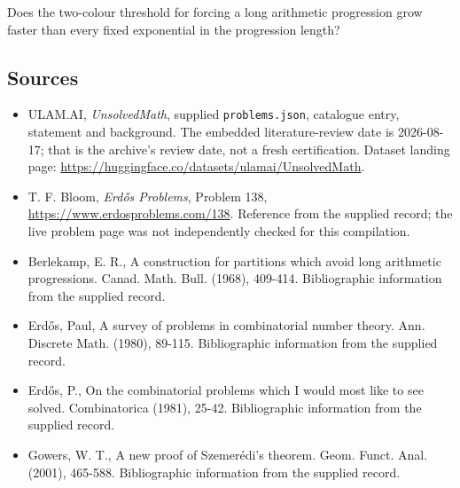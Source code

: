 \documentclass[11pt,a4paper]{article}
\begin{document}
Does the two-colour threshold for forcing a long arithmetic progression grow faster than every fixed exponential in the progression length?

\subsection{Sources}

{\small

\begin{itemize}

\item[\hypertarget{source:statement:1}{S1}] ULAM.AI, \emph{UnsolvedMath}, supplied \texttt{problems.json}, catalogue entry, statement and background. The embedded literature-review date is 2026-08-17; that is the archive’s review date, not a fresh certification. Dataset landing page: \url{https://huggingface.co/datasets/ulamai/UnsolvedMath}.

\item[\hypertarget{source:statement:2}{S2}] T. F. Bloom, \emph{Erdős Problems}, Problem 138, \url{https://www.erdosproblems.com/138}. Reference from the supplied record; the live problem page was not independently checked for this compilation.

\item[\hypertarget{source:statement:3}{S3}] Berlekamp, E. R., A construction for partitions which avoid long arithmetic progressions. Canad. Math. Bull. (1968), 409-414. Bibliographic information from the supplied record.

\item[\hypertarget{source:statement:4}{S4}] Erd\H{o}s, Paul, A survey of problems in combinatorial number theory. Ann. Discrete Math. (1980), 89-115. Bibliographic information from the supplied record.

\item[\hypertarget{source:statement:5}{S5}] Erd\H{o}s, P., On the combinatorial problems which I would most like to see solved. Combinatorica (1981), 25-42. Bibliographic information from the supplied record.

\item[\hypertarget{source:statement:6}{S6}] Gowers, W. T., A new proof of Szemer\'{e}di's theorem. Geom. Funct. Anal. (2001), 465-588. Bibliographic information from the supplied record.

\end{itemize}

}

\label{end:statement}
\end{document}
